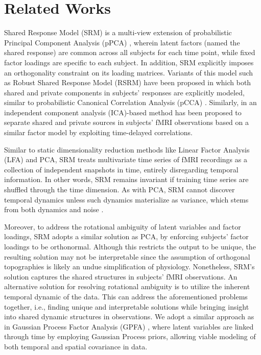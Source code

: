 \section{Related Works}
\label{ch1:sec:related_models}
Shared Response Model (SRM) \cite{srm} is a multi-view extension of probabilistic Principal Component Analysis (pPCA) \cite{ppca}, wherein latent factors (named the shared response) are common across all subjects for each time point, while fixed factor loadings are specific to each subject. In addition, SRM explicitly imposes an orthogonality constraint on its loading matrices. Variants of this model such as Robust Shared Response Model (RSRM) \cite{rsrm} have been proposed in which both shared and private components in subjects' responses are explicitly modeled, similar to probabilistic Canonical Correlation Analysis (pCCA) \cite{pcca}. Similarly, in \cite{lukic2002ica} an independent component analysis (ICA)-based method has been proposed to separate shared and private sources in subjects' fMRI observations based on a similar factor model by exploiting time-delayed correlations.

Similar to static dimensionality reduction methods like Linear Factor Analysis (LFA) and PCA, SRM treats multivariate time series of fMRI recordings as a collection of independent snapshots in time, entirely disregarding temporal information. In other words, SRM remains invariant if training time series are shuffled through the time dimension. As with PCA, SRM cannot discover temporal dynamics unless such dynamics materialize as variance, which stems from both dynamics and noise \cite{dca}. 

Moreover, to address the rotational ambiguity of latent variables and factor loadings, SRM adopts a similar solution as PCA, by enforcing subjects' factor loadings to be orthonormal. Although this restricts the output to be unique, the resulting solution may not be interpretable since the assumption of orthogonal topographies is likely an undue simplification of physiology. Nonetheless, SRM's solution captures the shared structures in subjects' fMRI observations. An alternative solution for resolving rotational ambiguity is to utilize the inherent temporal dynamic of the data. This can address the aforementioned problems together, i.e., finding unique and interpretable solutions while bringing insight into shared dynamic structures in observations. We adopt a similar approach as in Gaussian Process Factor Analysis (GPFA) \cite{gpfa}, where latent variables are linked through time by employing Gaussian Process priors, allowing viable modeling of both temporal and spatial covariance in data.

